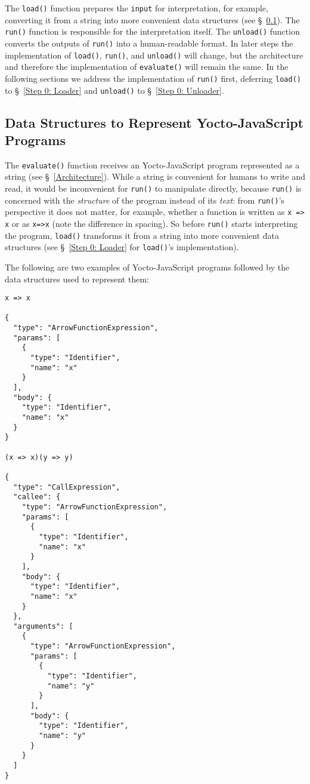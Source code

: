 \documentclass[12pt, oneside]{book}
\begin{document}
The \texttt{load()} function prepares the \texttt{input} for interpretation, for example, converting it from a string into more convenient data structures (see §~\ref{Data Structures to Represent Yocto-JavaScript Programs}). The \texttt{run()} function is responsible for the interpretation itself. The \texttt{unload()} function converts the outputs of \texttt{run()} into a human-readable format. In later steps the implementation of \texttt{load()}, \texttt{run()}, and \texttt{unload()} will change, but the architecture and therefore the implementation of \texttt{evaluate()} will remain the same. In the following sections we address the implementation of \texttt{run()} first, deferring \texttt{load()} to §~\ref{Step 0: Loader} and \texttt{unload()} to §~\ref{Step 0: Unloader}.

\subsection{Data Structures to Represent Yocto-JavaScript Programs}
\label{Data Structures to Represent Yocto-JavaScript Programs}

The \texttt{evaluate()} function receives an Yocto-JavaScript program represented as a string (see §~\ref{Architecture}). While a string is convenient for humans to write and read, it would be inconvenient for \texttt{run()} to manipulate directly, because \texttt{run()} is concerned with the \emph{structure} of the program instead of its \emph{text}: from \texttt{run()}’s perspective it does not matter, for example, whether a function is written as \texttt{x => x} or as \texttt{x=>x} (note the difference in spacing). So before \texttt{run()} starts interpreting the program, \texttt{load()} transforms it from a string into more convenient data structures (see §~\ref{Step 0: Loader} for \texttt{load()}’s implementation).

The following are two examples of Yocto-JavaScript programs followed by the data structures used to represent them:

\begin{verbatim}
x => x

{
  "type": "ArrowFunctionExpression",
  "params": [
    {
      "type": "Identifier",
      "name": "x"
    }
  ],
  "body": {
    "type": "Identifier",
    "name": "x"
  }
}

(x => x)(y => y)

{
  "type": "CallExpression",
  "callee": {
    "type": "ArrowFunctionExpression",
    "params": [
      {
        "type": "Identifier",
        "name": "x"
      }
    ],
    "body": {
      "type": "Identifier",
      "name": "x"
    }
  },
  "arguments": [
    {
      "type": "ArrowFunctionExpression",
      "params": [
        {
          "type": "Identifier",
          "name": "y"
        }
      ],
      "body": {
        "type": "Identifier",
        "name": "y"
      }
    }
  ]
}
\end{verbatim}
\end{document}

